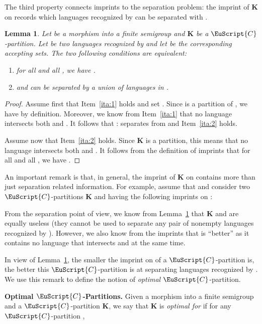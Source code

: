 \documentclass{CSML}
\newcommand\Cs{\ensuremath{\EuScript{C}}\xspace}
\newcommand\Kb{\ensuremath{\mathbf{K}}\xspace}
\theoremstyle{plain}
\newtheorem{lemma}[thm]{Lemma}
\begin{document}
The third property connects imprints to the separation problem: the
imprint of \Kb on  records which languages recognized by
 can be separated with .

\begin{lemma} \label{lem:imprint}
  Let  be a morphism into a finite semigroup
   and \Kb be a \Cs-partition. Let  be two languages
  recognized by  and let  be the
  corresponding accepting sets. The two following conditions are
  equivalent:
  \begin{enumerate}
  \item\label{ita:1} for all  and all , we have .
  \item \label{ita:2}  and  can be separated by a union of languages in
    .
  \end{enumerate}
\end{lemma}

\begin{proof}
  Assume first that Item~\ref{ita:1} holds and set . Since  is a
  partition of , we have  by definition. Moreover,
  we know from Item~\ref{ita:1} that no language 
  intersects both  and . It follows that :  separates  from  and Item~\ref{ita:2} holds.

  Assume now that Item~\ref{ita:2} holds. Since \Kb is a partition, this
  means that no language  intersects both  and . It
  follows from the definition of imprints that for all  and
  all , we have .
\end{proof}

An important remark is that, in general, the imprint of \Kb on
 contains more than just separation related information. For
example, assume that  and consider two
\Cs-partitions \Kb and  having the following imprints on
:

From the separation point of view, we know from
Lemma~\ref{lem:imprint} that \Kb and  are equally useless (they
cannot be used to separate any pair of nonempty languages recognized by
). However, we also know from the imprints that  is
``better'' as it contains no language that intersects
 and  at the same
time.

In view of Lemma~\ref{lem:imprint}, the smaller the imprint on
 of a \Cs-partition is, the better this \Cs-partition is at
separating languages recognized by . We use this remark to
define the notion of \emph{optimal} \Cs-partition.

\medskip
\noindent
{\bf Optimal \Cs-Partitions.} Given a morphism  into a finite semigroup  and a \Cs-partition \Kb,
we say that \Kb is \emph{optimal for } if for any
\Cs-partition ,
\end{document}
